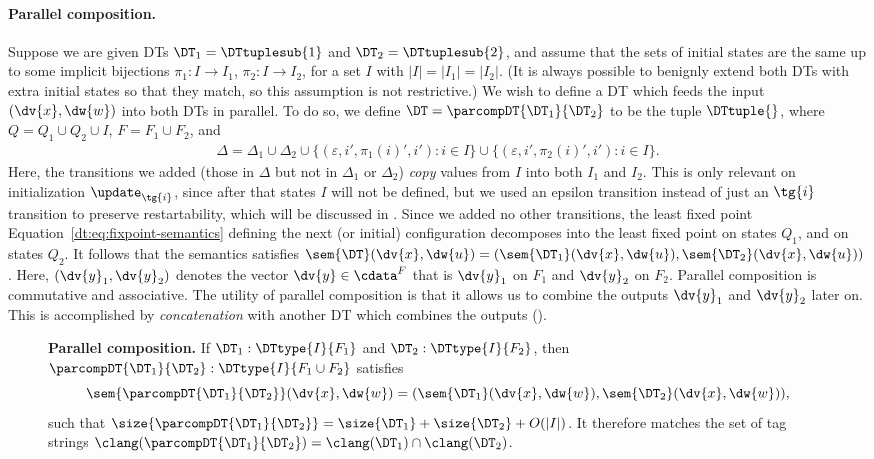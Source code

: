 \paragraph*{Parallel composition.}
Suppose we are given DTs $\DT_1 = \DTtuplesub{1}$ and $\DT_2 = \DTtuplesub{2}$, and assume that the sets of initial states are the same up to some implicit bijections $\pi_1: I \to I_1$, $\pi_2: I \to I_2$, for a set $I$ with $|I| = |I_1| = |I_2|$. (It is always possible to benignly extend both DTs with extra initial states so that they match, so this assumption is not restrictive.)
We wish to define a DT which feeds the input $(\dv{x},\dw{w})$ into both DTs in parallel. To do so, we define $\DT = \parcompDT{\DT_1}{\DT_2}$ to be the tuple $\DTtuple{}$, where $Q = Q_1 \cup Q_2 \cup I$, $F = F_1 \cup F_2$, and
\begin{align*}
\Delta = \Delta_1 \cup \Delta_2
    \cup \big\{(\varepsilon, i', \pi_1(i)', i') : i \in I \big\}
    \cup \big\{(\varepsilon, i', \pi_2(i)', i') : i \in I \big\}.
\end{align*}
Here, the transitions we added (those in $\Delta$ but not in $\Delta_1$ or $\Delta_2$) \emph{copy} values from $I$ into both $I_1$ and $I_2$. This is only relevant on initialization $\update_{\tg{i}}$, since after that states $I$ will not be defined, but we used an epsilon transition instead of just an ${\tg{i}}$ transition to preserve restartability, which will be discussed in . Since we added no other transitions, the least fixed point Equation~\eqref{dt:eq:fixpoint-semantics} defining the next (or initial) configuration decomposes into the least fixed point on states $Q_1$, and on states $Q_2$. It follows that the semantics satisfies $\sem{\DT}(\dv{x},\dw{u}) = (\sem{\DT_1}(\dv{x},\dw{u}),\sem{\DT_2}(\dv{x},\dw{u}))$. Here, $(\dv{y}_1,\dv{y}_2)$ denotes the vector $\dv{y} \in \cdata^F$ that is $\dv{y}_1$ on $F_1$ and $\dv{y}_2$ on $F_2$.
Parallel composition is commutative and associative.
The utility of parallel composition is that it allows us to combine the outputs $\dv{y}_1$ and $\dv{y}_2$ later on. This is accomplished by \emph{concatenation} with another DT which combines the outputs ().

\begin{figure}[H]
\begin{dtbox}
\textbf{Parallel composition.}
If $\DT_1: \DTtype{I}{F_1}$ and $\DT_2: \DTtype{I}{F_2}$,
then $\parcompDT{\DT_1}{\DT_2} : \DTtype{I}{F_1 \cup F_2}$ satisfies
\[
\sem{\parcompDT{\DT_1}{\DT_2}}(\dv{x},\dw{w}) = (\sem{\DT_1}(\dv{x},\dw{w}),\sem{\DT_2}(\dv{x},\dw{w})),
\]
such that $\size{\parcompDT{\DT_1}{\DT_2}} = \size{\DT_1} + \size{\DT_2} + O(|I|)$.
It therefore matches the set of tag strings
$\clang(\parcompDT{\DT_1}{\DT_2}) = \clang(\DT_1) \cap \clang(\DT_2)$.
\end{dtbox}

\label{dt:fig:parallel-composition}
\end{figure}

